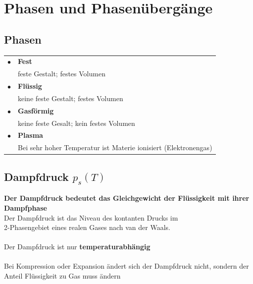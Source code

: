 \section{Phasen und Phasenübergänge}


\subsection{Phasen}


\begin{tabular}{ll}
$\bullet$ & \textbf{Fest} \\
		  & feste Gestalt; festes Volumen \\
$\bullet$ & \textbf{Flüssig} \\
		  & keine feste Gestalt; festes Volumen \\
$\bullet$ & \textbf{Gasförmig} \\
		  & keine feste Gesalt; kein festes Volumen \\
$\bullet$ & \textbf{Plasma} \\
		  & Bei sehr hoher Temperatur ist Materie ionisiert (Elektronengas) \\
\end{tabular}





\vfill\null
\columnbreak


\subsection{Dampfdruck $p_s(T)$}
\textbf{Der Dampfdruck bedeutet das Gleichgewicht der Flüssigkeit mit ihrer Dampfphase} \\

Der Dampfdruck ist das Niveau des kontanten Drucks im\\
2-Phasengebiet eines realen Gases nach van der Waals. \\
\\
Der Dampfdruck ist nur \textbf{temperaturabhängig} \\
\\
Bei Kompression oder Expansion ändert sich der Dampfdruck nicht, sondern der Anteil Flüssigkeit zu Gas muss ändern \\
\\

